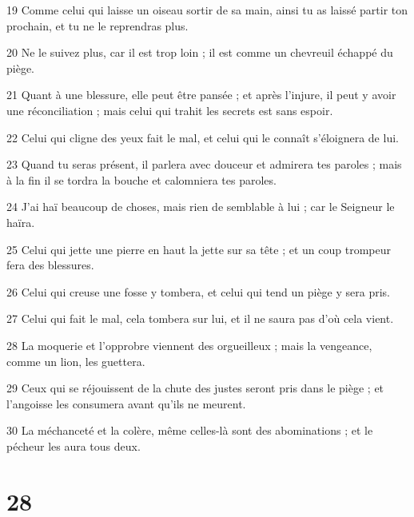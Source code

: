\par 19 Comme celui qui laisse un oiseau sortir de sa main, ainsi tu as laissé partir ton prochain, et tu ne le reprendras plus.
\par 20 Ne le suivez plus, car il est trop loin ; il est comme un chevreuil échappé du piège.
\par 21 Quant à une blessure, elle peut être pansée ; et après l'injure, il peut y avoir une réconciliation ; mais celui qui trahit les secrets est sans espoir.
\par 22 Celui qui cligne des yeux fait le mal, et celui qui le connaît s'éloignera de lui.
\par 23 Quand tu seras présent, il parlera avec douceur et admirera tes paroles ; mais à la fin il se tordra la bouche et calomniera tes paroles.
\par 24 J'ai haï beaucoup de choses, mais rien de semblable à lui ; car le Seigneur le haïra.
\par 25 Celui qui jette une pierre en haut la jette sur sa tête ; et un coup trompeur fera des blessures.
\par 26 Celui qui creuse une fosse y tombera, et celui qui tend un piège y sera pris.
\par 27 Celui qui fait le mal, cela tombera sur lui, et il ne saura pas d'où cela vient.
\par 28 La moquerie et l'opprobre viennent des orgueilleux ; mais la vengeance, comme un lion, les guettera.
\par 29 Ceux qui se réjouissent de la chute des justes seront pris dans le piège ; et l'angoisse les consumera avant qu'ils ne meurent.
\par 30 La méchanceté et la colère, même celles-là sont des abominations ; et le pécheur les aura tous deux.

\chapter{28}

